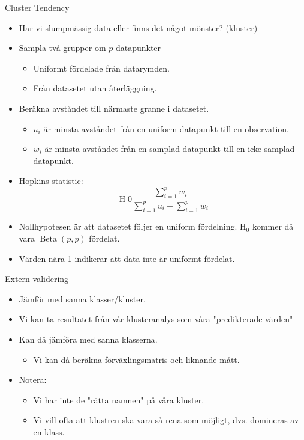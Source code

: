 \documentclass[10pt,english]{beamer}
\begin{document}
\begin{frame}{Cluster Tendency}

    \begin{itemize}
        \item Har vi slumpmässig data eller finns det något mönster? (kluster)
        \item Sampla två grupper om $p$ datapunkter
        \begin{itemize}
            \item Uniformt fördelade från datarymden.
            \item Från datasetet utan återläggning.
        \end{itemize}
        \item Beräkna avståndet till närmaste granne i datasetet.
        \begin{itemize}
            \item $u_i$ är minsta avståndet från en uniform datapunkt till en observation.
            \item $w_i$ är minsta avståndet från en samplad datapunkt till en icke-samplad datapunkt.
        \end{itemize}
        \item Hopkins statistic:
        \begin{equation*}
            \operatorname{H} 0 \frac{\sum_{i=1}^{p}w_i}{\sum_{i=1}^{p}u_i + \sum_{i=1}^{p}w_i}
        \end{equation*}
        \item Nollhypotesen är att datasetet följer en uniform fördelning. $\operatorname{H_0}$ kommer då vara $\operatorname{Beta}(p,p)$ fördelat.
        \item Värden nära 1 indikerar att data inte är uniformt fördelat.
        
    \end{itemize}
    
\end{frame}

\begin{frame}{Extern validering}

    \begin{itemize}
        \item Jämför med sanna klasser/kluster.
        \item Vi kan ta resultatet från vår klusteranalys som våra "predikterade värden"
        \item Kan då jämföra med sanna klasserna.
        \begin{itemize}
            \item Vi kan då beräkna förväxlingsmatris och liknande mått.
        \end{itemize}
        \item Notera:
        \begin{itemize}
            \item Vi har inte de "rätta namnen" på våra kluster.
            \item Vi vill ofta att klustren ska vara så rena som möjligt, dvs. domineras av en klass.
        \end{itemize}
    \end{itemize}
    
\end{frame}
\end{document}
